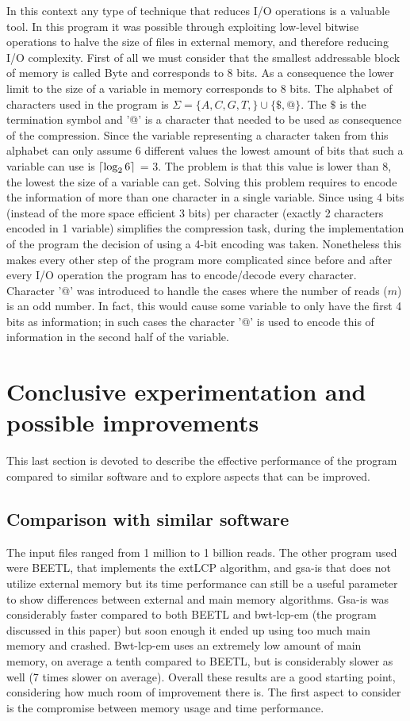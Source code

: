 \documentclass[a4paper,12pt, oneside]{article}
\DeclarePairedDelimiter\ceil{\lceil}{\rceil}
\begin{document}
In this context any type of technique that reduces I/O operations is a valuable tool. In this program it was possible through exploiting low-level bitwise operations to halve the size of files in external memory, and therefore reducing I/O complexity. First of all we must consider that the smallest addressable block of memory is called Byte and corresponds to 8 bits. As a consequence the lower limit to the size of a variable in memory corresponds to 8 bits. The alphabet of characters used in the program is $\Sigma = \{A, C, G, T, \} \cup \{\$, @\}$. The $\$$ is the termination symbol and '@' is a character that needed to be used as consequence of the compression. Since the variable representing a character taken from this alphabet can only assume 6 different values the lowest amount of bits that such a variable can use is $\ceil*{\log_2 6}$ = 3. The problem is that this value is lower than 8, the lowest the size of a variable can get. Solving this problem requires to encode the information of more than one character in a single variable. Since using 4 bits (instead of the more space efficient 3 bits) per character (exactly 2 characters encoded in 1 variable) simplifies the compression task, during the implementation of the program the decision of using a 4-bit encoding was taken. Nonetheless this makes every other step of the program more complicated since before and after every I/O operation the program has to encode/decode every character. Character '@' was introduced to handle the cases where the number of reads ($m$) is an odd number. In fact, this would cause some variable to only have the first 4 bits as  information; in such cases the character '@' is used to encode this  of information in the second half of the variable.

\section{Conclusive experimentation and possible improvements}

This last section is devoted to describe the effective performance of the program compared to similar software and to explore aspects that can be improved.

\subsection{Comparison with similar software}

The input files ranged from 1 million to 1 billion reads. The other program used were BEETL, that implements the extLCP algorithm, and gsa-is that does not utilize external memory but its time performance can still be a useful parameter to show differences between external and main memory algorithms. Gsa-is was considerably faster compared to both BEETL and bwt-lcp-em (the program discussed in this paper) but soon enough it ended up using too much main memory and crashed. Bwt-lcp-em uses an extremely low amount of main memory, on average a tenth compared to BEETL, but is considerably slower as well (7 times slower on average). Overall these results are a good starting point, considering how much room of improvement there is. The first aspect to consider is the compromise between memory usage and time performance.
\end{document}
